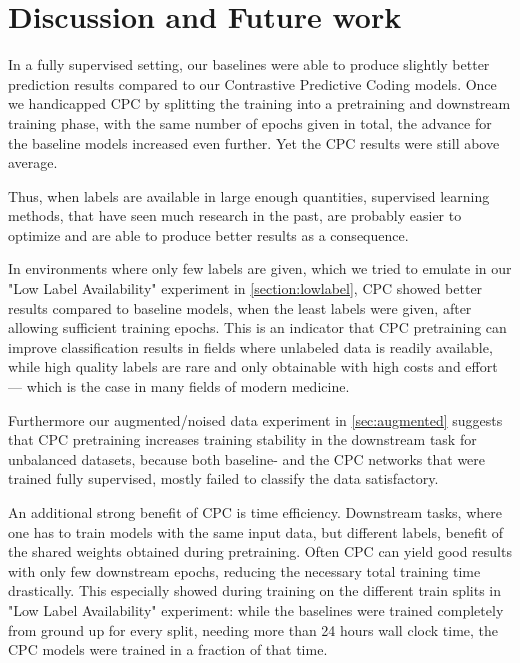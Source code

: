 \section{Discussion and Future work} \label{sec:discussion}

In a fully supervised setting, our baselines were able to produce slightly better prediction results compared to our Contrastive Predictive Coding models. Once we handicapped CPC by splitting the training into a pretraining and downstream training phase, with the same number of epochs given in total, the advance for the baseline models increased even further. Yet the CPC results were still above average.

Thus, when labels are available in large enough quantities, supervised learning methods, that have seen much research in the past, are probably easier to optimize and are able to produce better results as a consequence.

In environments where only few labels are given, which we tried to emulate in our "Low Label Availability" experiment in \autoref{section:lowlabel}, CPC showed better results compared to baseline models, when the least labels were given, after allowing sufficient training epochs. This is an indicator that CPC pretraining can improve classification results in fields where unlabeled data is readily available, while high quality labels are rare and only obtainable with high costs and effort --- which is the case in many fields of modern medicine.

Furthermore our augmented/noised data experiment in \autoref{sec:augmented} suggests that CPC pretraining increases training stability in the downstream task for unbalanced datasets, because both baseline- and the CPC networks that were trained fully supervised, mostly failed to classify the data satisfactory.

An additional strong benefit of CPC is time efficiency. Downstream tasks, where one has to train models with the same input data, but different labels, benefit of the shared  weights obtained during pretraining. Often CPC can yield good results with only few downstream epochs, reducing the necessary total training time drastically. This especially showed during training on the different train splits in "Low Label Availability" experiment: while the baselines were trained completely from ground up for every split, needing more than 24 hours wall clock time, the CPC models were trained in a fraction of that time.


